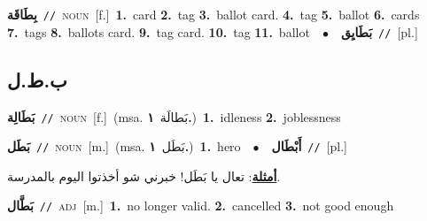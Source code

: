 \documentclass[10pt,a4paper,twoside]{article} %
\begin{document}
\begin{multicols}{2}
{\setlength\topsep{0pt}\textbf{\foreignlanguage{arabic}{بِطَاقَة}}\ {\color{gray}\texttt{//}\color{black}}\ \textsc{noun}\ [f.]\ \textbf{1.}~card  \textbf{2.}~tag  \textbf{3.}~ballot card.  \textbf{4.}~tag  \textbf{5.}~ballot  \textbf{6.}~cards  \textbf{7.}~tags  \textbf{8.}~ballots card.  \textbf{9.}~tag card.  \textbf{10.}~tag  \textbf{11.}~ballot\ \ $\bullet$\ \ \setlength\topsep{0pt}\textbf{\foreignlanguage{arabic}{بَطَايِق}}\ {\color{gray}\texttt{//}\color{black}}\ [pl.]\ } \vspace{2mm}

\vspace{-3mm}
\subsection*{\color{blue}\foreignlanguage{arabic}{ب.ط.ل}\color{blue}{}} 

{\setlength\topsep{0pt}\textbf{\foreignlanguage{arabic}{بَطَالِة}}\ {\color{gray}\texttt{//}\color{black}}\ \textsc{noun}\ [f.]\ \color{gray}(msa. \foreignlanguage{arabic}{بَطالَة}~\foreignlanguage{arabic}{\textbf{١.}})\color{black}\ \textbf{1.}~idleness  \textbf{2.}~joblessness\ } \vspace{2mm}

{\setlength\topsep{0pt}\textbf{\foreignlanguage{arabic}{بَطَل}}\ {\color{gray}\texttt{//}\color{black}}\ \textsc{noun}\ [m.]\ \color{gray}(msa. \foreignlanguage{arabic}{بَطَل}~\foreignlanguage{arabic}{\textbf{١.}})\color{black}\ \textbf{1.}~hero\ \ $\bullet$\ \ \setlength\topsep{0pt}\textbf{\foreignlanguage{arabic}{أَبْطَال}}\ {\color{gray}\texttt{//}\color{black}}\ [pl.]\  \begin{flushright}\color{gray}\foreignlanguage{arabic}{\textbf{\underline{\foreignlanguage{arabic}{أمثلة}}}: تعال يا بَطَل! خبرني شو أخذتوا اليوم بالمدرسة.}\end{flushright}\color{black}} \vspace{2mm}

{\setlength\topsep{0pt}\textbf{\foreignlanguage{arabic}{بَطَّال}}\ {\color{gray}\texttt{//}\color{black}}\ \textsc{adj}\ [m.]\ \textbf{1.}~no longer valid.  \textbf{2.}~cancelled  \textbf{3.}~not good enough\ } \vspace{2mm}


\end{multicols}
\end{document}
